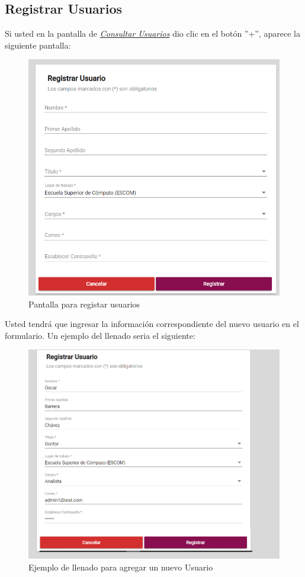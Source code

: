     \newpage
        \hypertarget{registrarUs}{}
        \subsection{Registrar Usuarios}
            Si usted  en la pantalla de \hyperlink{consultarUs}{\textit{Consultar Usuarios}} dio clic en el botón ''+'', aparece la siguiente pantalla:

            \begin{figure}[H]
                \centering
                \hypertarget{registrarUs}{\includegraphics[width=0.7\linewidth]{images/SP5/Registro-Usuario-vacio}}
                \caption{Pantalla para registar usuarios}
                \label{registrarrh}
            \end{figure}

            Usted tendrá que ingresar la información correspondiente del nuevo usuario en el formulario. Un ejemplo del llenado seria el siguiente:

            \begin{figure}[H]
                \centering
                \hypertarget{ejreg}{\includegraphics[width=0.7\linewidth]{images/SP5/Registro-Usuario-UA}}
                \caption{Ejemplo de llenado para agregar un nuevo Usuario}
                \label{ejreg}
            \end{figure}

